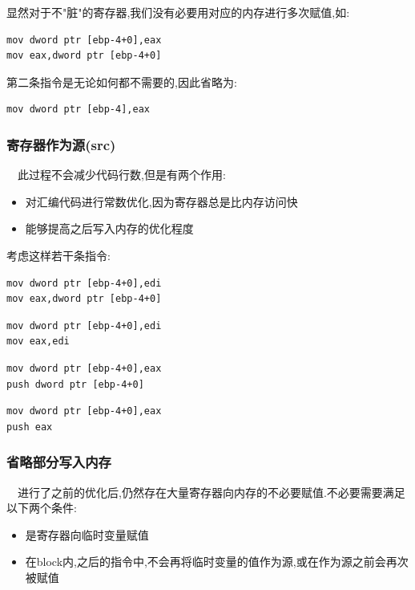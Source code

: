 \documentclass{article}
\begin{document}
显然对于不"脏"的寄存器,我们没有必要用对应的内存进行多次赋值,如:

\begin{verbatim}
mov dword ptr [ebp-4+0],eax
mov eax,dword ptr [ebp-4+0]
\end{verbatim}

第二条指令是无论如何都不需要的,因此省略为:

\begin{verbatim}
mov dword ptr [ebp-4],eax
\end{verbatim}

\subsubsection{寄存器作为源(src)}

\quad\ \ 此过程不会减少代码行数,但是有两个作用:
\begin{itemize}
	\item 对汇编代码进行常数优化,因为寄存器总是比内存访问快
    \item 能够提高之后写入内存的优化程度
\end{itemize}

考虑这样若干条指令:

\begin{verbatim}
mov dword ptr [ebp-4+0],edi
mov eax,dword ptr [ebp-4+0]
\end{verbatim}

\begin{verbatim}
mov dword ptr [ebp-4+0],edi
mov eax,edi
\end{verbatim}

\begin{verbatim}
mov dword ptr [ebp-4+0],eax
push dword ptr [ebp-4+0]
\end{verbatim}

\begin{verbatim}
mov dword ptr [ebp-4+0],eax
push eax
\end{verbatim}

\subsubsection{省略部分写入内存}

\quad\ \ 进行了之前的优化后,仍然存在大量寄存器向内存的不必要赋值.不必要需要满足以下两个条件:

\begin{itemize}
\item 是寄存器向临时变量赋值
\item 在block内,之后的指令中,不会再将临时变量的值作为源,或在作为源之前会再次被赋值
\end{itemize}
\end{document}
